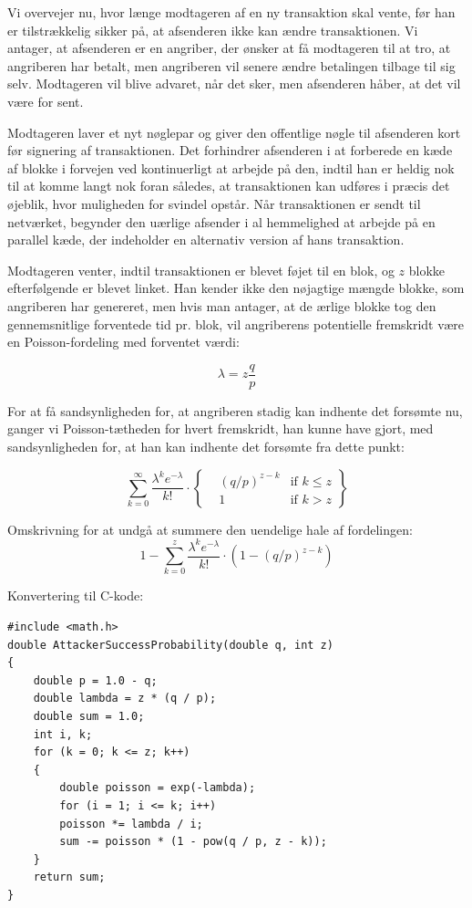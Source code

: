 \documentclass{article}
\begin{document}
Vi overvejer nu, hvor længe modtageren af en ny transaktion skal vente, før han er tilstrækkelig sikker på, at afsenderen ikke kan ændre transaktionen. Vi antager, at afsenderen
er en angriber, der ønsker at få modtageren til at tro, at angriberen har betalt, men angriberen vil senere ændre betalingen tilbage til sig selv. Modtageren vil blive advaret,
når det sker, men afsenderen håber, at det vil være for sent.

Modtageren laver et nyt nøglepar og giver den offentlige nøgle til afsenderen kort før signering af transaktionen. Det forhindrer afsenderen i at forberede en kæde af blokke i
forvejen ved kontinuerligt at arbejde på den, indtil han er heldig nok til at komme langt nok foran således, at transaktionen kan udføres i præcis det øjeblik, hvor muligheden
for svindel opstår. Når transaktionen er sendt til netværket, begynder den uærlige afsender i al hemmelighed at arbejde på en parallel kæde, der indeholder en alternativ version
af hans transaktion.

Modtageren venter, indtil transaktionen er blevet føjet til en blok, og $z$ blokke efterfølgende er blevet linket. Han kender ikke den nøjagtige mængde blokke, som angriberen
har genereret, men hvis man antager, at de ærlige blokke tog den gennemsnitlige forventede tid pr. blok, vil angriberens potentielle fremskridt være en Poisson-fordeling med
forventet værdi:

\[
    \lambda= z \frac{q}{p}
\]

For at få sandsynligheden for, at angriberen stadig kan indhente det forsømte nu, ganger vi Poisson-tætheden for hvert fremskridt, han kunne have gjort, med sandsynligheden
for, at han kan indhente det forsømte fra dette punkt:

\[
    \sum_{k = 0}^{\infty} {
        \frac{\lambda^k e^{-\lambda}}{k!} \cdot
        \left\{\begin{aligned}
        & {(q / p)}^{z-k} & \text{if } k \le z \\
        &  1  & \text{if } k > z
        \end{aligned}\right\}
    }
\]

Omskrivning for at undgå at summere den uendelige hale af fordelingen:\[
    1 - \sum_{k = 0}^{z} {
        \frac{\lambda^k e^{-\lambda}}{k!} \cdot \left(1 - {(q / p)}^{z-k} \right)
    }
\]

Konvertering til C-kode: \\

\begin{verbatim}
#include <math.h>
double AttackerSuccessProbability(double q, int z)
{
    double p = 1.0 - q;
    double lambda = z * (q / p);
    double sum = 1.0;
    int i, k;
    for (k = 0; k <= z; k++)
    {
        double poisson = exp(-lambda);
        for (i = 1; i <= k; i++)
        poisson *= lambda / i;
        sum -= poisson * (1 - pow(q / p, z - k));
    }
    return sum;
}
\end{verbatim}
\end{document}
